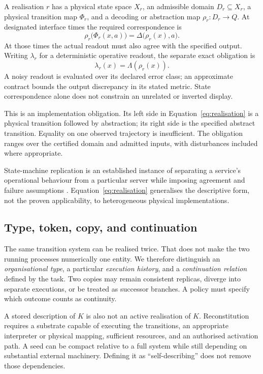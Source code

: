 \documentclass[11pt,a4paper]{article}
\theoremstyle{definition}
\theoremstyle{remark}
\newcommand{\calK}{K}
\begin{document}
A realisation $r$ has a physical state space $X_r$, an admissible domain $D_r\subseteq X_r$, a physical transition map $\Phi_r$, and a decoding or abstraction map $\rho_r:D_r\to Q$. At designated interface times the required correspondence is
\begin{equation}\label{eq:realisation}
 \rho_r\bigl(\Phi_r(x,a)\bigr)=\Delta\bigl(\rho_r(x),a\bigr).
\end{equation}
At those times the actual readout must also agree with the specified output. Writing $\lambda_r$ for a deterministic operative readout, the separate exact obligation is
\begin{equation}\label{eq:outputcorrespondence}
 \lambda_r(x)=\Lambda(\rho_r(x)).
\end{equation}
A noisy readout is evaluated over its declared error class; an approximate contract bounds the output discrepancy in its stated metric. State correspondence alone does not constrain an unrelated or inverted display.

This is an implementation obligation. Its left side in Equation~\eqref{eq:realisation} is a physical transition followed by abstraction; its right side is the specified abstract transition. Equality on one observed trajectory is insufficient. The obligation ranges over the certified domain and admitted inputs, with disturbances included where appropriate.

State-machine replication is an established instance of separating a service's operational behaviour from a particular server while imposing agreement and failure assumptions \citep{schneider}. Equation~\eqref{eq:realisation} generalises the descriptive form, not the proven applicability, to heterogeneous physical implementations.

\subsection{Type, token, copy, and continuation}
The same transition system can be realised twice. That does not make the two running processes numerically one entity. We therefore distinguish an \emph{organisational type}, a particular \emph{execution history}, and a \emph{continuation relation} defined by the task. Two copies may remain consistent replicas, diverge into separate executions, or be treated as successor branches. A policy must specify which outcome counts as continuity.

A stored description of $\calK$ is also not an active realisation of $\calK$. Reconstitution requires a substrate capable of executing the transitions, an appropriate interpreter or physical mapping, sufficient resources, and an authorised activation path. A seed can be compact relative to a full system while still depending on substantial external machinery. Defining it as ``self-describing'' does not remove those dependencies.
\end{document}
